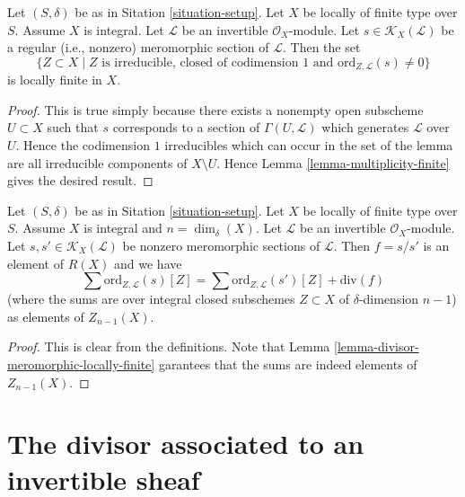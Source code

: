 \begin{lemma}
\label{lemma-divisor-meromorphic-locally-finite}
Let $(S, \delta)$ be as in Sitation \ref{situation-setup}.
Let $X$ be locally of finite type over $S$. Assume $X$ is
integral. Let $\mathcal{L}$ be an invertible $\mathcal{O}_X$-module.
Let $s \in \mathcal{K}_X(\mathcal{L})$ be a regular (i.e., nonzero)
meromorphic section of $\mathcal{L}$. Then the set
$$
\{Z \subset X \mid Z \text{ is irreducible, closed of codimension }1
\text{ and }\text{ord}_{Z, \mathcal{L}}(s) \not = 0\}
$$
is locally finite in $X$.
\end{lemma}

\begin{proof}
This is true simply because there exists a nonempty open subscheme
$U \subset X$ such that $s$ corresponds to a section of
$\Gamma(U, \mathcal{L})$ which generates $\mathcal{L}$ over $U$.
Hence the codimension $1$
irreducibles which can occur in the set of the lemma are all
irreducible components of $X \setminus U$.
Hence Lemma \ref{lemma-multiplicity-finite} gives the desired result.
\end{proof}

\begin{lemma}
\label{lemma-divisor-meromorphic-well-defined}
Let $(S, \delta)$ be as in Sitation \ref{situation-setup}.
Let $X$ be locally of finite type over $S$. Assume $X$ is
integral and $n = \dim_\delta(X)$.
Let $\mathcal{L}$ be an invertible $\mathcal{O}_X$-module.
Let $s, s' \in \mathcal{K}_X(\mathcal{L})$ be nonzero
meromorphic sections of $\mathcal{L}$. Then $f = s/s'$
is an element of $R(X)$ and we have
$$
\sum \text{ord}_{Z, \mathcal{L}}(s)[Z]
=
\sum \text{ord}_{Z, \mathcal{L}}(s')[Z]
+
\text{div}(f)
$$
(where the sums are over integral closed subschemes $Z \subset X$
of $\delta$-dimension $n - 1$) as elements of $Z_{n - 1}(X)$.
\end{lemma}

\begin{proof}
This is clear from the definitions.
Note that Lemma \ref{lemma-divisor-meromorphic-locally-finite}
garantees that the sums are indeed
elements of $Z_{n - 1}(X)$.
\end{proof}









\section{The divisor associated to an invertible sheaf}
\label{section-divisor-invertible-sheaf}

